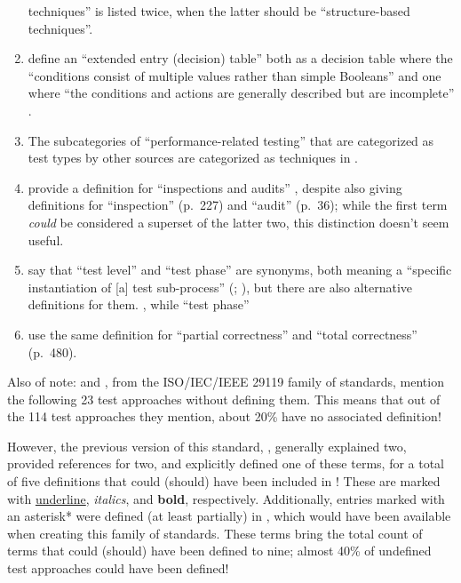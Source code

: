 \begin{enumerate}
            techniques'' is listed twice, when the latter should be
            ``structure-based techniques''.
      \item \citeauthor{IEEE2021} define an ``extended entry (decision) table''
            both as a decision table where the ``conditions consist of multiple
            values rather than simple Booleans'' \citeyearpar[p.~18]{IEEE2021}
            and one where ``the conditions and actions are generally described
            but are incomplete'' \citeyearpar[p.~175]{IEEE2017} .
      \item The subcategories of ``performance-related testing'' that are
            categorized as test types by other sources \citep{IEEE2022, IEEE2017,
                  IEEE2013} are categorized as techniques in
            \citeyearpar[p.~39]{IEEE2021}.
      \item \citeauthor*{IEEE2017} provide a definition for ``inspections and
            audits'' \citeyearpar[p.~228]{IEEE2017}, despite also giving
            definitions for ``inspection'' (p.~227) and ``audit'' (p.~36);
            while the first term \emph{could} be considered a superset of the
            latter two, this distinction doesn't seem useful.
      \item \citeauthor*{IEEE2017} say that ``test level'' and ``test phase''
            are synonyms, both meaning a ``specific instantiation of [a] test
            sub-process'' (\citeyear[pp.~469,~470]{IEEE2017};
            \citeyear[p.~9]{IEEE2013}), but there are also alternative
            definitions for them. \procLevel{\citeyearpar}, while
            ``test phase'' \phaseDef{}
      \item \citeauthor{IEEE2017} use the same definition for ``partial correctness''
            \citeyearpar[p.~314]{IEEE2017} and ``total correctness'' (p.~480).
\end{enumerate}

Also of note: \citep{IEEE2022} and \citeyearpar{IEEE2021}, from the
ISO/IEC/IEEE 29119 family of standards, mention the following 23 test
approaches without defining them. This means that out of the 114 test
approaches they mention, about 20\% have no associated definition!

However, the previous version of this standard, \citeyearpar{IEEE2013},
generally explained two, provided references for two, and explicitly defined
one of these terms, for a total of five definitions that could (should) have
been included in \citeyearpar{IEEE2022}! These are marked with
\underline{underline}, \emph{italics}, and \textbf{bold}, respectively.
Additionally, entries marked with an asterisk* were defined (at least
partially) in \citeyearpar{IEEE2017}, which would have been available when
creating this family of standards. These terms bring the total count of terms
that could (should) have been defined to nine; almost 40\% of undefined test
approaches could have been defined!

